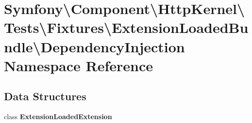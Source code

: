 \section{Symfony\textbackslash{}Component\textbackslash{}Http\+Kernel\textbackslash{}Tests\textbackslash{}Fixtures\textbackslash{}Extension\+Loaded\+Bundle\textbackslash{}Dependency\+Injection Namespace Reference}
\label{namespace_symfony_1_1_component_1_1_http_kernel_1_1_tests_1_1_fixtures_1_1_extension_loaded_bundle_1_1_dependency_injection}
\subsection*{Data Structures}
\begin{DoxyCompactItemize}
\item 
class {\bf Extension\+Loaded\+Extension}
\end{DoxyCompactItemize}
